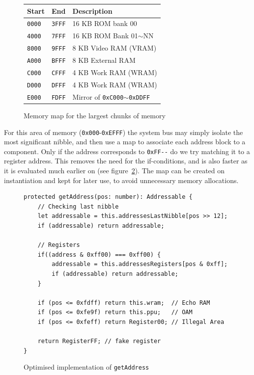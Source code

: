 \documentclass[11pt]{informatics-report}
\begin{document}
\begin{figure}[h]
    \centering
    \begin{tabular}{|l|l|l|}
    \hline
    \textbf{Start} & \textbf{End} & \textbf{Description} \\ \hline
    \texttt{0000} & \texttt{3FFF} & 16 KB ROM bank 00 \\ \hline
    \texttt{4000} & \texttt{7FFF} & 16 KB ROM Bank 01$\sim$NN \\ \hline
    \texttt{8000} & \texttt{9FFF} & 8 KB Video RAM (VRAM) \\ \hline
    \texttt{A000} & \texttt{BFFF} & 8 KB External RAM \\ \hline
    \texttt{C000} & \texttt{CFFF} & 4 KB Work RAM (WRAM) \\ \hline
    \texttt{D000} & \texttt{DFFF} & 4 KB Work RAM (WRAM) \\ \hline
    \texttt{E000} & \texttt{FDFF} & Mirror of \texttt{0xC000}$\sim$\texttt{0xDDFF} \\ \hline
    \end{tabular}
    \caption{Memory map for the largest chunks of memory \cite{memorymap}}
    \label{fig:memory-map-largest}
\end{figure}

For this area of memory (\texttt{0x000}-\texttt{0xEFFF}) the system bus may simply isolate the most significant nibble, and then use a map to associate each address block to a component. Only if the address corresponds to \texttt{0xFF-{}-} do we try matching it to a register address. This removes the need for the if-conditions, and is also faster as it is evaluated much earlier on (see figure~\ref{fig:getaddress-after}). The map can be created on instantiation and kept for later use, to avoid unnecessary memory allocations.

\begin{figure}[h]
    \begin{verbatim}
protected getAddress(pos: number): Addressable {
    // Checking last nibble
    let addressable = this.addressesLastNibble[pos >> 12];
    if (addressable) return addressable;

    // Registers
    if((address & 0xff00) === 0xff00) {
        addressable = this.addressesRegisters[pos & 0xff];
        if (addressable) return addressable;
    }

    if (pos <= 0xfdff) return this.wram;  // Echo RAM
    if (pos <= 0xfe9f) return this.ppu;   // OAM
    if (pos <= 0xfeff) return Register00; // Illegal Area

    return RegisterFF; // fake register
}
    \end{verbatim}
    \caption{Optimised implementation of \texttt{getAddress}}
    \label{fig:getaddress-after}
\end{figure}
\end{document}
